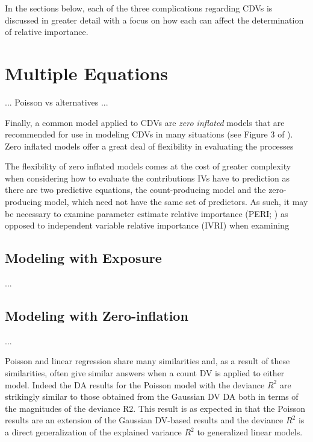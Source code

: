 \documentclass[ShortAfour,times,sageapa]{sagej}
\begin{document}
	
	
	In the sections below, each of the three complications regarding CDVs is discussed in greater detail with a focus on how each can affect the determination of relative importance.
	
\section{Multiple Equations}
	
	... Poisson vs alternatives ...
		
	Finally, a common model applied to CDVs are \emph{zero inflated} models that are recommended for use in modeling CDVs in many situations (see Figure 3 of \cite{blevins2015count}).  Zero inflated models offer a great deal of flexibility in evaluating the processes
	
	The flexibility of zero inflated models comes at the cost of greater complexity when considering how to evaluate the contributions IVs have to prediction as there are two predictive equations, the count-producing model and the zero-producing model, which need not have the same set of predictors.  As such, it may be necessary to examine parameter estimate relative importance (PERI; \cite{luchman2020relative}) as opposed to independent variable relative importance (IVRI) when examining 

	\subsection{Modeling with Exposure}
	
	...
	
	\subsection{Modeling with Zero-inflation}
	
	...
	
	
	Poisson and linear regression share many similarities and, as a result of these similarities, often give similar answers when a count DV is applied to either model.
	Indeed the DA results for the Poisson model with the deviance $R^2$ are strikingly similar to those obtained from the Gaussian DV DA both in terms of the magnitudes of the deviance R2.  
	This result is as expected in that the Poisson results are an extension of the Gaussian DV-based results and the deviance $R^2$ is a direct generalization of the explained variance $R^2$ to generalized linear models.
	
\end{document}
